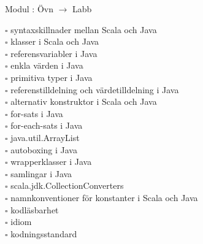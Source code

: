 
    Modul : Övn  $\rightarrow$ Labb 
    \begin{multicols}{3}\SlideFontTiny
    $\square$ syntaxskillnader mellan Scala och Java \\
$\square$ klasser i Scala och Java \\
$\square$ referensvariabler i Java \\
$\square$ enkla värden i Java \\
$\square$ primitiva typer i Java \\
$\square$ referenstilldelning och värdetilldelning i Java \\
$\square$ alternativ konstruktor i Scala och Java \\
$\square$ for-sats i Java \\
$\square$ for-each-sats i Java \\
$\square$ java.util.ArrayList \\
$\square$ autoboxing i Java \\
$\square$ wrapperklasser i Java \\
$\square$ samlingar i Java \\
$\square$ scala.jdk.CollectionConverters \\
$\square$ namnkonventioner för konstanter i Scala och Java \\
$\square$ kodläsbarhet \\
$\square$ idiom \\
$\square$ kodningsstandard \\
    \end{multicols}
    
